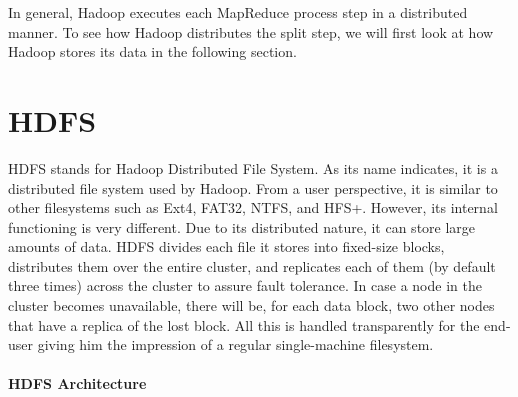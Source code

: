 \documentclass[12pt,english]{book}
\begin{document}
In general, Hadoop executes each MapReduce process step in a distributed manner.
To see how Hadoop distributes the split step, we will first look at how Hadoop stores its data in the following section.


\section{HDFS}


HDFS stands for Hadoop Distributed File System.
As its name indicates, it is a distributed file system used by Hadoop.
From a user perspective, it is similar to other filesystems such as Ext4, FAT32, NTFS, and HFS+.
However, its internal functioning is very different.
Due to its distributed nature, it can store large amounts of data.
HDFS divides each file it stores into fixed-size blocks, distributes them over the entire cluster, and replicates each of them (by default three times) across the cluster to assure fault tolerance.
In case a node in the cluster becomes unavailable, there will be, for each data block, two other nodes that have a replica of the lost block.
All this is handled transparently for the end-user giving him the impression of a regular single-machine filesystem.

\paragraph{HDFS Architecture}\mbox{}\\
\end{document}
